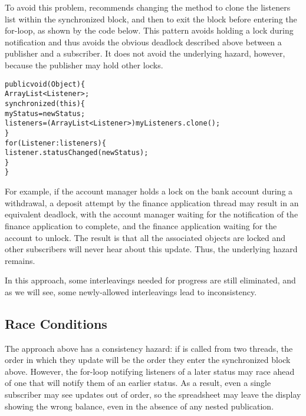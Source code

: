 \documentclass{llncs}
\begin{document}
To avoid this problem, \cite{Englander:beans} recommends changing the
 method to clone the listeners list within the
synchronized block, and then to exit the block before entering the
for-loop, as shown by the code below. This pattern avoids holding a
lock during notification and thus avoids the obvious deadlock
described above between a publisher and a subscriber.  It does not
avoid the underlying hazard, however, because the publisher may hold
other locks.
%
\begin{alltt}
    public void (Object ) \{
        ArrayList<Listener> ;
        synchronized (this) \{
            myStatus = newStatus;
            listeners = (ArrayList<Listener>)myListeners.clone();
        \}
        for (Listener : listeners) \{
            listener.statusChanged(newStatus);
        \}
    \}
\end{alltt}
%
For example, if the account manager holds a lock on the bank account
during a withdrawal, a deposit attempt by the finance application
thread may result in an equivalent deadlock, with the account manager
waiting for the notification of the finance application to complete,
and the finance application waiting for the account to unlock.  The
result is that all the associated objects are locked and other
subscribers will never hear about this update.  Thus, the underlying
hazard remains.

In this approach, some interleavings needed for progress are still
eliminated, and as we will see, some newly-allowed interleavings lead
to inconsistency.

\subsection{Race Conditions}

The approach above has a consistency hazard: if  is
called from two threads, the order in which they update 
will be the order they enter the synchronized block above. However,
the for-loop notifying listeners of a later status may race ahead of
one that will notify them of an earlier status. As a result, even a
single subscriber may see updates out of order, so the spreadsheet may
leave the display showing the wrong balance, even in the absence of
any nested publication.
\end{document}
